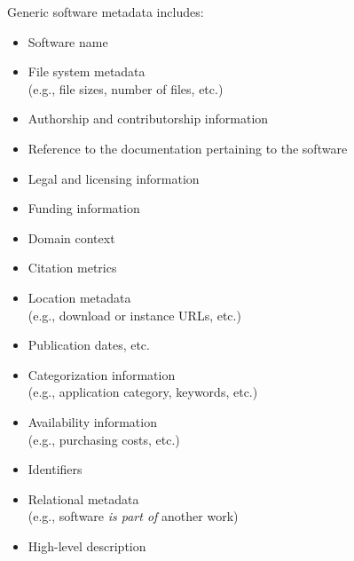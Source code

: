 \documentclass[11pt,a4paper]{scrartcl}
\begin{document}
\begin{multicols}{2}
    \raggedright
    Generic software metadata includes:
    \begin{itemize}  
        \item Software name
        \item File system metadata \\ {\small (e.g., file sizes, number of files, etc.)}
        \item Authorship and contributorship information
        \item Reference to the documentation pertaining to the software
        \item Legal and licensing information
        \item Funding information
        \item Domain context
        \item Citation metrics
        \item Location metadata \\ {\small (e.g., download or instance URLs, etc.)}
        \item Publication dates, etc.
        \item Categorization information \\ {\small (e.g., application category, keywords, etc.)}
        \item Availability information \\ {\small (e.g., purchasing costs, etc.)}
        \item Identifiers
        \item Relational metadata \\ {\small (e.g., software \textit{is part of} another work)}
        \item High-level description
    \end{itemize}
    \columnbreak
    

\end{multicols}
\end{document}
